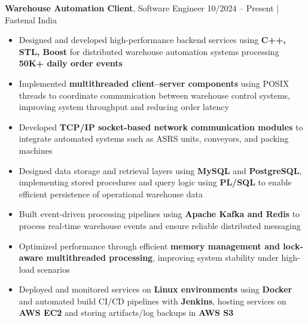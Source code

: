 \documentclass[11.9pt,a4paper]{article}
\begin{document}
\noindent
\textbf{Warehouse Automation Client}, Software Engineer \hfill 10/2024 -- Present | Fastenal India
\begin{itemize}
  \item Designed and developed high-performance backend services using \textbf{C++, STL, Boost} for distributed warehouse automation systems processing \textbf{50K+ daily order events}
  \item Implemented \textbf{multithreaded client--server components} using POSIX threads to coordinate communication between warehouse control systems, improving system throughput and reducing order latency
  \item Developed \textbf{TCP/IP socket-based network communication modules} to integrate automated systems such as ASRS units, conveyors, and packing machines
  \item Designed data storage and retrieval layers using \textbf{MySQL} and \textbf{PostgreSQL}, implementing stored procedures and query logic using \textbf{PL/SQL} to enable efficient persistence of operational warehouse data
  \item Built event-driven processing pipelines using \textbf{Apache Kafka and Redis} to process real-time warehouse events and ensure reliable distributed messaging
  \item Optimized performance through efficient \textbf{memory management and lock-aware multithreaded processing}, improving system stability under high-load scenarios
  \item Deployed and monitored services on \textbf{Linux environments} using \textbf{Docker} and automated build CI/CD pipelines with \textbf{Jenkins}, hosting services on \textbf{AWS EC2} and storing artifacts/log backups in \textbf{AWS S3}
\end{itemize}

\vspace{8pt}
\end{document}
